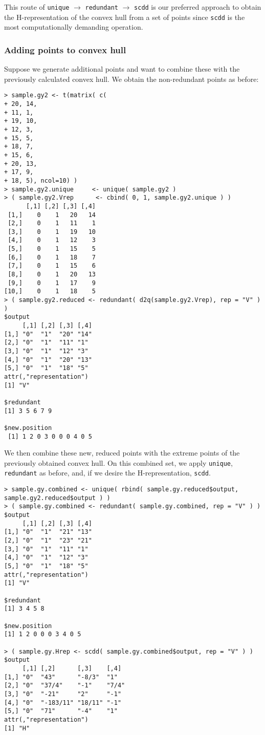 This route of \texttt{unique} $\rightarrow$ \texttt{redundant} $\rightarrow$ 
\texttt{scdd} is our preferred approach to obtain the H-representation of the convex hull from a set of points since \texttt{scdd} is the most computationally demanding
operation.

\subsubsection{Adding points to convex hull}
Suppose we generate additional points and want to combine these with the previously 
calculated convex hull.  We obtain the non-redundant points as before:
\begin{verbatim}
> sample.gy2 <- t(matrix( c(
+ 20, 14,
+ 11, 1,
+ 19, 10,
+ 12, 3,
+ 15, 5,
+ 18, 7,
+ 15, 6,
+ 20, 13,
+ 17, 9,
+ 18, 5), ncol=10) ) 
> sample.gy2.unique 	<- unique( sample.gy2 ) 
> ( sample.gy2.Vrep 	 <- cbind( 0, 1, sample.gy2.unique ) )
      [,1] [,2] [,3] [,4]
 [1,]    0    1   20   14
 [2,]    0    1   11    1
 [3,]    0    1   19   10
 [4,]    0    1   12    3
 [5,]    0    1   15    5
 [6,]    0    1   18    7
 [7,]    0    1   15    6
 [8,]    0    1   20   13
 [9,]    0    1   17    9
[10,]    0    1   18    5
> ( sample.gy2.reduced <- redundant( d2q(sample.gy2.Vrep), rep = "V" ) )
$output
     [,1] [,2] [,3] [,4]
[1,] "0"  "1"  "20" "14"
[2,] "0"  "1"  "11" "1" 
[3,] "0"  "1"  "12" "3" 
[4,] "0"  "1"  "20" "13"
[5,] "0"  "1"  "18" "5" 
attr(,"representation")
[1] "V"

$redundant
[1] 3 5 6 7 9

$new.position
 [1] 1 2 0 3 0 0 0 4 0 5
\end{verbatim}

We then combine these new, reduced points with the extreme points of the previously
obtained convex hull.  On this combined set, we apply \texttt{unique}, 
\texttt{redundant} as before, and, if we desire the H-representation, \texttt{scdd}.

\begin{verbatim}
> sample.gy.combined <- unique( rbind( sample.gy.reduced$output, 
sample.gy2.reduced$output ) )
> ( sample.gy.combined <- redundant( sample.gy.combined, rep = "V" ) )
$output
     [,1] [,2] [,3] [,4]
[1,] "0"  "1"  "21" "13"
[2,] "0"  "1"  "23" "21"
[3,] "0"  "1"  "11" "1" 
[4,] "0"  "1"  "12" "3" 
[5,] "0"  "1"  "18" "5" 
attr(,"representation")
[1] "V"

$redundant
[1] 3 4 5 8

$new.position
[1] 1 2 0 0 0 3 4 0 5

> ( sample.gy.Hrep <- scdd( sample.gy.combined$output, rep = "V" ) )
$output
     [,1] [,2]      [,3]    [,4] 
[1,] "0"  "43"      "-8/3"  "1"  
[2,] "0"  "37/4"    "-1"    "7/4"
[3,] "0"  "-21"     "2"     "-1" 
[4,] "0"  "-183/11" "18/11" "-1" 
[5,] "0"  "71"      "-4"    "1"  
attr(,"representation")
[1] "H"
\end{verbatim}

